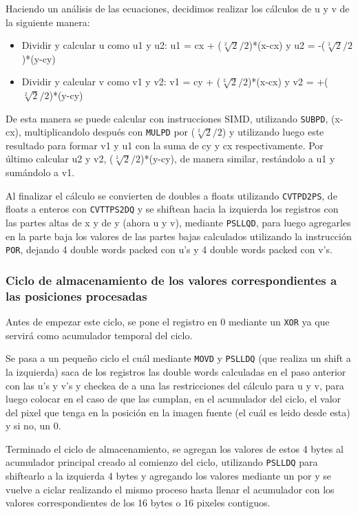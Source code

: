 Haciendo un análisis de las ecuaciones, decidimos realizar los cálculos de u y v de la siguiente manera:
\begin{itemize}
\item Dividir y calcular u como u1 y u2: u1 = cx + ($\sqrt[2]{2}/2$)*(x-cx) y u2 = -($\sqrt[2]{2}/2$)*(y-cy)
\item Dividir y calcular v como v1 y v2: v1 = cy + ($\sqrt[2]{2}/2$)*(x-cx) y v2 = +($\sqrt[2]{2}/2$)*(y-cy)
\end{itemize}

De esta manera se puede calcular con instrucciones SIMD, utilizando \texttt{SUBPD}, (x-cx), multiplicandolo después con \texttt{MULPD} por ($\sqrt[2]{2}/2$) y utilizando luego este resultado para formar v1 y u1 con la suma de cy y cx respectivamente. Por último calcular u2 y v2, ($\sqrt[2]{2}/2$)*(y-cy), de manera similar, restándolo a u1 y sumándolo a v1.

Al finalizar el cálculo se convierten de doubles a floats utilizando \texttt{CVTPD2PS}, de floats a enteros con \texttt{CVTTPS2DQ} y se shiftean hacia la izquierda los registros con las partes altas de x y de y (ahora u y v), mediante \texttt{PSLLQD}, para luego agregarles en la parte baja los valores de las partes bajas calculados utilizando la instrucción \texttt{POR}, dejando 4 double words packed con u's y 4 double words packed con v's.

\subsubsection{Ciclo de almacenamiento de los valores correspondientes a las posiciones procesadas}
Antes de empezar este ciclo, se pone el registro \rbp en 0 mediante un \texttt{XOR} ya que servirá como acumulador temporal del ciclo.

Se pasa a un pequeño ciclo el cuál mediante \texttt{MOVD} y \texttt{PSLLDQ} (que realiza un shift a la izquierda) saca de los registros las double words calculadas en el paso anterior con las u's y v's y checkea de a una las restricciones del cálculo para u y v, para luego colocar en el caso de que las cumplan, en el acumulador del ciclo, el valor del pixel que tenga en la posición en la imagen fuente (el cuál es leido desde esta) y si no, un 0.

Terminado el ciclo de almacenamiento, se agregan los valores de estos 4 bytes al acumulador principal creado al comienzo del ciclo, utilizando \texttt{PSLLDQ} para shiftearlo a la izquierda 4 bytes y agregando los valores mediante un por y se vuelve a ciclar realizando el mismo proceso hasta llenar el acumulador con los valores correspondientes de los 16 bytes o 16 pixeles contiguos.


